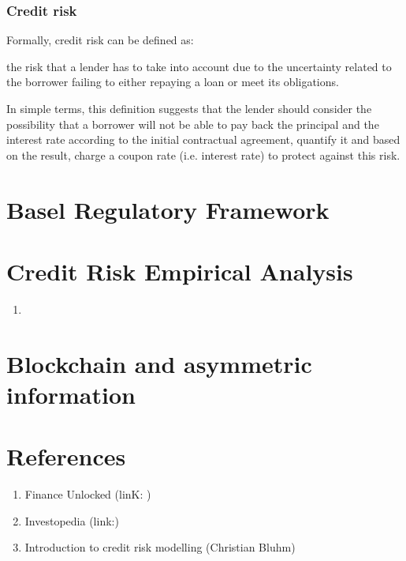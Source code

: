 \documentclass[a4paper,12pt]{article}
\begin{document}
    \subsubsection{Credit risk}

        Formally, credit risk can be defined as:
        \begin{definition}
            the risk that a lender has to take into account due to the uncertainty related to the borrower failing to either repaying a loan or meet its obligations.
        \end{definition}

        In simple terms, this definition suggests that the lender should consider the possibility that a borrower will not be able to pay back the principal and the 
        interest rate according to the initial contractual agreement, quantify it and based on the result, charge a coupon rate (i.e. interest rate) to protect
        against this risk. 


        

    



    
    \pagebreak
    \section{Basel Regulatory Framework}
    
    \pagebreak
    \section{Credit Risk Empirical Analysis}

    \begin{enumerate}
        \item 
    \end{enumerate}
    
    \pagebreak
    \section{Blockchain and asymmetric information}

    \pagebreak
    \section{References}

    \begin{enumerate}
        \item Finance Unlocked (linK: )
        \item Investopedia (link:)
        \item Introduction to credit risk modelling (Christian Bluhm)
    \end{enumerate}
\end{document}
